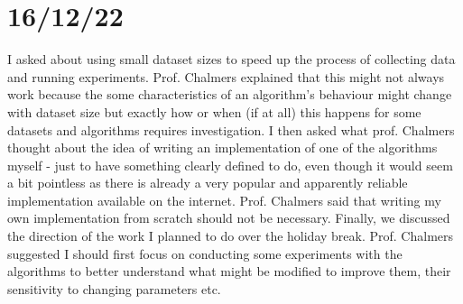 \documentclass[11pt]{article}
\begin{document}
    \section{16/12/22}
    I asked about using small dataset sizes to speed up the process of collecting data and running experiments.
    Prof. Chalmers explained that this might not always work because the some characteristics of an algorithm's
    behaviour might change with dataset size but exactly how or when (if at all) this happens for some datasets and
    algorithms requires investigation. I then asked what prof. Chalmers thought about the idea of writing an
    implementation of one of the algorithms myself - just to have something clearly defined to do, even though it would
    seem a bit pointless as there is already a very popular and apparently reliable implementation available on the
    internet. Prof. Chalmers said that writing my own implementation from scratch should not be necessary.
    Finally, we discussed the direction of the work I planned to do over the holiday break. Prof. Chalmers suggested
    I should first focus on conducting some experiments with the algorithms to better understand what might be modified
    to improve them, their sensitivity to changing parameters etc.
    
\end{document}
